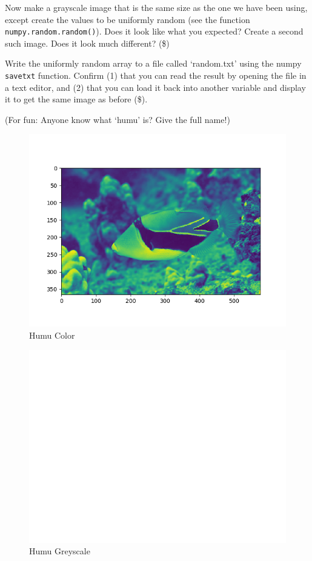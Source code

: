 \documentclass[10pt]{article}
\begin{document}
\begin{enumerate}
Now make a grayscale image that is the same size as the one we have been using, except create the values to be uniformly random (see the function {\tt numpy.random.random()}).  Does it look like what you expected?  Create a second such image.  Does it look much different? (\$)

Write the uniformly random array to a file called `random.txt' using the numpy {\tt savetxt} function.  Confirm (1) that you can read the result by opening the file in a text editor, and (2) that you can load it back into another variable and display it to get the same image as before (\$).

(For fun: Anyone know what `humu' is?  Give the full name!)

\begin{figure}

\centering
  \includegraphics[width=\linewidth]{code/humu-color.png}
 \caption{Humu Color}
\label{label}

\end{figure}

\begin{figure}

\centering
  \includegraphics[width=\linewidth]{code/humu-gray.png}
 \caption{Humu Greyscale}
\label{label}


\end{figure}
\end{enumerate}
\end{document}
